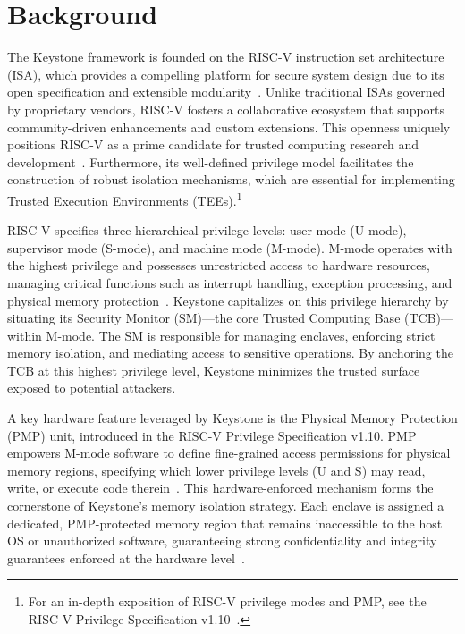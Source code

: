 \chapter{Background}
\label{chap:background}

The Keystone framework is founded on the RISC-V instruction set architecture (ISA), which provides a compelling platform for secure system design due to its open specification and extensible modularity~\cite{lee2019keystone,dayeol2019keystone}. Unlike traditional ISAs governed by proprietary vendors, RISC-V fosters a collaborative ecosystem that supports community-driven enhancements and custom extensions. This openness uniquely positions RISC-V as a prime candidate for trusted computing research and development~\cite{Survey2023}. Furthermore, its well-defined privilege model facilitates the construction of robust isolation mechanisms, which are essential for implementing Trusted Execution Environments (TEEs).\footnote{For an in-depth exposition of RISC-V privilege modes and PMP, see the RISC-V Privilege Specification v1.10~\cite{keystone2025how}.}

RISC-V specifies three hierarchical privilege levels: user mode (U-mode), supervisor mode (S-mode), and machine mode (M-mode). M-mode operates with the highest privilege and possesses unrestricted access to hardware resources, managing critical functions such as interrupt handling, exception processing, and physical memory protection~\cite{lee2019keystone}. Keystone capitalizes on this privilege hierarchy by situating its Security Monitor (SM)—the core Trusted Computing Base (TCB)—within M-mode. The SM is responsible for managing enclaves, enforcing strict memory isolation, and mediating access to sensitive operations. By anchoring the TCB at this highest privilege level, Keystone minimizes the trusted surface exposed to potential attackers.

A key hardware feature leveraged by Keystone is the Physical Memory Protection (PMP) unit, introduced in the RISC-V Privilege Specification v1.10. PMP empowers M-mode software to define fine-grained access permissions for physical memory regions, specifying which lower privilege levels (U and S) may read, write, or execute code therein~\cite{keystone2025how}. This hardware-enforced mechanism forms the cornerstone of Keystone’s memory isolation strategy. Each enclave is assigned a dedicated, PMP-protected memory region that remains inaccessible to the host OS or unauthorized software, guaranteeing strong confidentiality and integrity guarantees enforced at the hardware level~\cite{lee2019keystone}.

